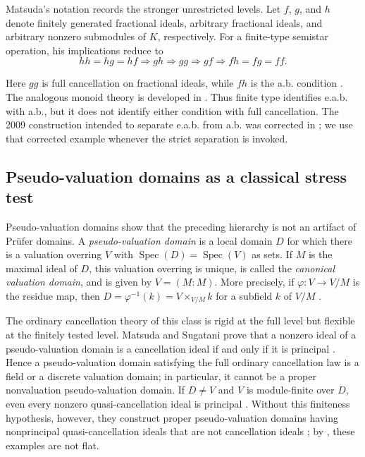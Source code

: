 \documentclass[11pt]{amsart}
\theoremstyle{definition}
\theoremstyle{remark}
\newcommand{\Spec}{\operatorname{Spec}}
\begin{document}
Matsuda's notation records the stronger unrestricted levels.  Let $f$, $g$,
and $h$ denote finitely generated fractional ideals, arbitrary fractional
ideals, and arbitrary nonzero submodules of $K$, respectively.  For a
finite-type semistar operation, his implications reduce to
\begin{equation}\label{eq:Matsuda}
 hh=hg=hf\Longrightarrow gh\Longrightarrow gg\Longrightarrow gf
 \Longrightarrow fh=fg=ff.
\end{equation}

Here $gg$ is full cancellation on fractional ideals, while $fh$ is the a.b.
condition \cite[Remarks~2 and~3]{MatsudaNote}.  The analogous monoid theory is
developed in \cite{MatsudaMonoids}.  Thus finite type identifies e.a.b. with
a.b., but it does not identify either condition with full cancellation.  The
2009 construction intended to separate e.a.b. from a.b. was corrected in
\cite{FontanaLoperMatsuda}; we use that corrected example whenever the strict
separation is invoked.

\subsection{Pseudo-valuation domains as a classical stress test}

Pseudo-valuation domains show that the preceding hierarchy is not an artifact
of Pr\"ufer domains.  A \emph{pseudo-valuation domain} is a local domain $D$
for which there is a valuation overring $V$ with
$\Spec(D)=\Spec(V)$ as sets.  If $M$ is the maximal ideal of $D$, this
valuation overring is unique, is called the \emph{canonical valuation domain},
and is given by $V=(M:M)$.  More precisely, if
$\varphi:V\to V/M$ is the residue map, then
$D=\varphi^{-1}(k)=V\times_{V/M}k$ for a subfield $k$ of $V/M$
\cite[pp.~3983--3984]{MatsudaSugatani}.

The ordinary cancellation theory of this class is rigid at the full level
but flexible at the finitely tested level.  Matsuda and Sugatani prove that a
nonzero ideal of a pseudo-valuation domain is a cancellation ideal if and
only if it is principal \cite[Theorem~3]{MatsudaSugatani}.  Hence a
pseudo-valuation domain satisfying the full ordinary cancellation law is a
field or a discrete valuation domain; in particular, it cannot be a proper
nonvaluation pseudo-valuation domain.  If $D\ne V$ and $V$ is module-finite
over $D$, even every nonzero
quasi-cancellation ideal is principal \cite[Theorem~4]{MatsudaSugatani}.
Without this finiteness hypothesis, however, they construct proper
pseudo-valuation domains having nonprincipal quasi-cancellation ideals that
are not cancellation ideals \cite[Examples~5 and~7]{MatsudaSugatani}; by
\cite[Proposition~6]{MatsudaSugatani}, these examples are not flat.
\end{document}
